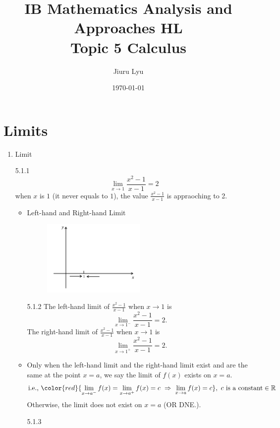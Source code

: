 \documentclass[12pt, a4paper]{article}
\title{\textbf{IB Mathematics Analysis and Approaches HL}\\
Topic 5 Calculus}
\author{Jiuru Lyu}
\date{\today}
\begin{document}
\maketitle
\tableofcontents

\newpage

\section{Limits}
\begin{enumerate}
    \item Limit
    \begin{example}{5.1.1}{}
        $$\lim_{x\rightarrow 1}\frac{x^2-1}{x-1}=2$$
        when $x$ is {\color{red}{approaching to}} $1$ (it never equals to $1$), the value $\frac{x^2-1}{x-1}$ is appraoching to 2.
    \end{example}
    \begin{itemize}
        \item Left-hand and Right-hand Limit 
        \begin{figure}[H]
            \centering 
            \includegraphics[width=0.5\textwidth]{Fig.5.1.jpg} 
        \end{figure}
        \begin{example}{5.1.2}{}
            The left-hand limit of $\frac{x^2-1}{x-1}$ when $x \rightarrow 1$ is $$\lim_{x \rightarrow 1^-}\frac{x^2-1}{x-1}=2.$$
            The right-hand limit of $\frac{x^2-1}{x-1}$ when $x \rightarrow 1$ is $$\lim_{x \rightarrow 1^+}\frac{x^2-1}{x-1}=2.$$
        \end{example}
        \item Only when the left-hand limit and the right-hand limit exist and are the same at the point $x=a$, we say the limit of $f(x)$ exists on $x=a$. 
        $$\text{i.e., }{\color{red}{\lim_{x\rightarrow a^-}f(x)=\lim_{x\rightarrow a^+}f(x)=c\ \Rightarrow\ \lim_{x\rightarrow a}f(x)=c}},\ c\text{ is a constant}\in \mathbb{R}$$
        Otherwise, the limit does not exist on $x=a$ {\color{green}(OR DNE.)}.
        \begin{example}{5.1.3}{}

\end{example}
\end{itemize}
\end{enumerate}
\end{document}
